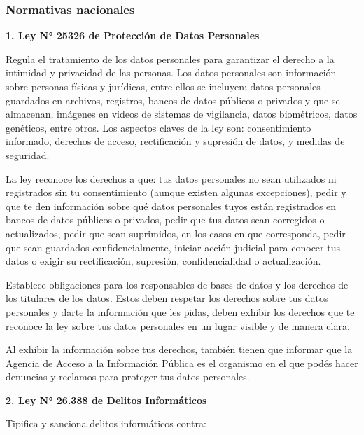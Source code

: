 \documentclass[a4paper,12pt]{article}
\begin{document}
    \subsubsection{Normativas nacionales}
    \par \textbf{1. Ley N° 25326 de Protección de Datos Personales} \newline
    \par Regula el tratamiento de los datos personales para garantizar el derecho a la intimidad y privacidad de las personas. Los datos personales son información sobre personas físicas y jurídicas, entre ellos se incluyen: datos personales guardados en archivos, registros, bancos de datos públicos o privados y que se almacenan, imágenes en videos de sistemas de vigilancia, datos biométricos, datos genéticos, entre otros. Los aspectos claves de la ley son: consentimiento informado, derechos de acceso, rectificación y supresión de datos, y medidas de seguridad.
    \par La ley reconoce los derechos a que: tus datos personales no sean utilizados ni registrados sin tu consentimiento (aunque existen algunas excepciones), pedir y que te den información sobre qué datos personales tuyos están registrados en bancos de datos públicos o privados, pedir que tus datos sean corregidos o actualizados, pedir que sean suprimidos, en los casos en que corresponda, pedir que sean guardados confidencialmente, iniciar acción judicial para conocer tus datos o exigir su rectificación, supresión, confidencialidad o actualización.
    \par Establece obligaciones para los responsables de bases de datos y los derechos de los titulares de los datos. Estos deben respetar los derechos sobre tus datos personales y darte la información que les pidas, deben exhibir los derechos que te reconoce la ley sobre tus datos personales en un lugar visible y de manera clara.
    \par Al exhibir la información sobre tus derechos, también tienen que informar que la Agencia de Acceso a la Información Pública es el organismo en el que podés hacer denuncias y reclamos para proteger tus datos personales.\cite{Ley25326}
    \newline
    \par \textbf{2. Ley N° 26.388 de Delitos Informáticos} 
    \newline
    \par Tipifica y sanciona delitos informáticos contra:
\end{document}
